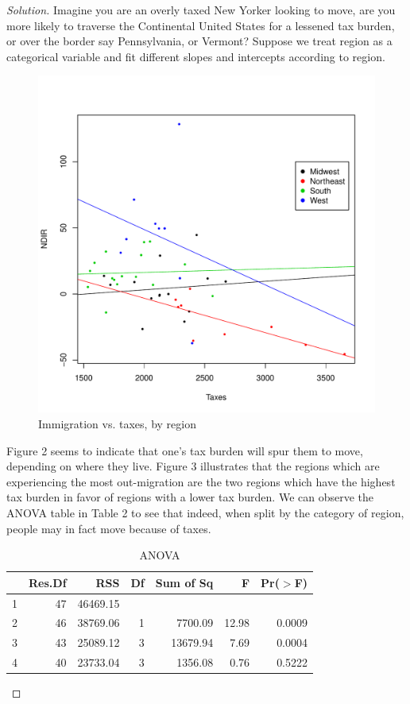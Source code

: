\documentclass{amsart}\usepackage[]{graphicx}\usepackage[]{color}
\newenvironment{knitrout}{}{} %
\begin{document}
\begin{proof}[Solution]
		Imagine you are an overly taxed New Yorker looking to move, are you more likely to traverse the Continental United States for a lessened tax burden, or over the border say Pennsylvania, or Vermont?
		Suppose we treat region as a categorical variable and fit different slopes and intercepts according to region.
		\begin{figure}[h]
\begin{knitrout}
\color{fgcolor}
\includegraphics[width=.7\linewidth]{figure/2_Fig2-1} 

\end{knitrout}
        \caption{Immigration vs. taxes, by region}
        \end{figure}
        Figure 2 seems to indicate that one's tax burden will spur them to move, depending on where they live.
        Figure 3 illustrates that the regions which are experiencing the most out-migration are the two regions which have the highest tax burden in favor of regions with a lower tax burden.
        We can observe the ANOVA table in Table 2 to see that indeed, when split by the category of region, people may in fact move because of taxes.
\begin{table}[ht]
\centering
\begin{tabular}{lrrrrrr}
  \hline
 & Res.Df & RSS & Df & Sum of Sq & F & Pr($>$F) \\ 
  \hline
1 & 47 & 46469.15 &  &  &  &  \\ 
  2 & 46 & 38769.06 & 1 & 7700.09 & 12.98 & 0.0009 \\ 
  3 & 43 & 25089.12 & 3 & 13679.94 & 7.69 & 0.0004 \\ 
  4 & 40 & 23733.04 & 3 & 1356.08 & 0.76 & 0.5222 \\ 
   \hline
\end{tabular}
\caption{ANOVA} 
\label{ANOVA}
\end{table}


\end{proof}
\end{document}
